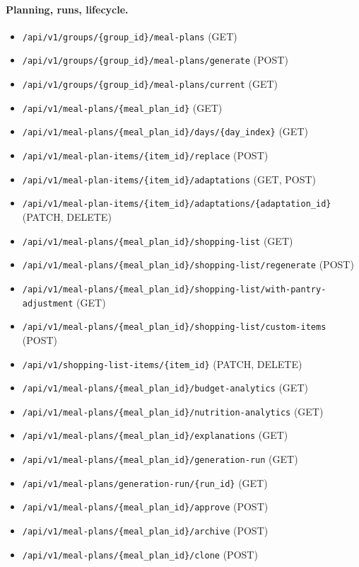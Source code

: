 \paragraph{Planning, runs, lifecycle.}
\begin{itemize}
\item \texttt{/api/v1/groups/\{group\_id\}/meal-plans} (GET)
\item \texttt{/api/v1/groups/\{group\_id\}/meal-plans/generate} (POST)
\item \texttt{/api/v1/groups/\{group\_id\}/meal-plans/current} (GET)
\item \texttt{/api/v1/meal-plans/\{meal\_plan\_id\}} (GET)
\item \texttt{/api/v1/meal-plans/\{meal\_plan\_id\}/days/\{day\_index\}} (GET)
\item \texttt{/api/v1/meal-plan-items/\{item\_id\}/replace} (POST)
\item \texttt{/api/v1/meal-plan-items/\{item\_id\}/adaptations} (GET, POST)
\item \texttt{/api/v1/meal-plan-items/\{item\_id\}/adaptations/\{adaptation\_id\}} (PATCH, DELETE)
\item \texttt{/api/v1/meal-plans/\{meal\_plan\_id\}/shopping-list} (GET)
\item \texttt{/api/v1/meal-plans/\{meal\_plan\_id\}/shopping-list/regenerate} (POST)
\item \texttt{/api/v1/meal-plans/\{meal\_plan\_id\}/shopping-list/with-pantry-adjustment} (GET)
\item \texttt{/api/v1/meal-plans/\{meal\_plan\_id\}/shopping-list/custom-items} (POST)
\item \texttt{/api/v1/shopping-list-items/\{item\_id\}} (PATCH, DELETE)
\item \texttt{/api/v1/meal-plans/\{meal\_plan\_id\}/budget-analytics} (GET)
\item \texttt{/api/v1/meal-plans/\{meal\_plan\_id\}/nutrition-analytics} (GET)
\item \texttt{/api/v1/meal-plans/\{meal\_plan\_id\}/explanations} (GET)
\item \texttt{/api/v1/meal-plans/\{meal\_plan\_id\}/generation-run} (GET)
\item \texttt{/api/v1/meal-plans/generation-run/\{run\_id\}} (GET)
\item \texttt{/api/v1/meal-plans/\{meal\_plan\_id\}/approve} (POST)
\item \texttt{/api/v1/meal-plans/\{meal\_plan\_id\}/archive} (POST)
\item \texttt{/api/v1/meal-plans/\{meal\_plan\_id\}/clone} (POST)

\end{itemize}
